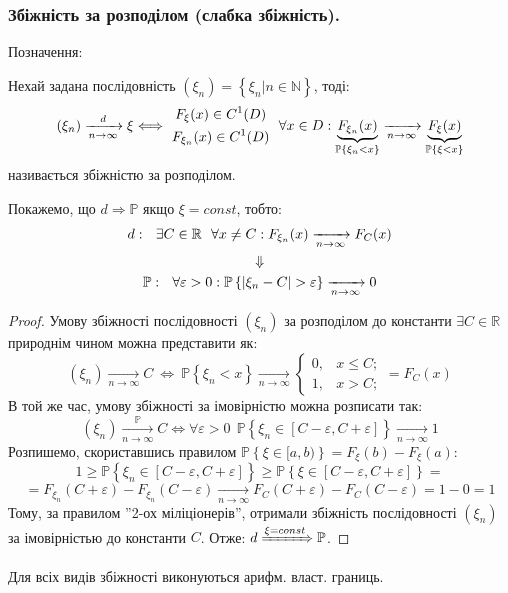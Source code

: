\subsubsection{Збіжність за розподілом (слабка збіжність).}

Позначення: 
\begin{defo} Нехай задана послідовність $(\xi_n) = \left\lbrace \xi_n \Big| n \in \mathbb{N} \right\rbrace$, тоді:
 $$
 (\xi_n) \xrightarrow[n \to \infty]{d} \xi \Longleftrightarrow\  \begin{gathered}
  F_{\xi}(x)\in C^{1}(D)\\
  F_{\xi_n}(x)\in C^{1}(D)
 \end{gathered}\ \  \forall x \in D:  \underbrace{F_{\xi_n}(x)}_{\mathbb{P} \left\lbrace \xi_n < x \right\rbrace} \xrightarrow[n\to\infty]{} \underbrace{F_{\xi}(x)}_{\mathbb{P} \left\lbrace \xi< x \right\rbrace}
 $$
 називається збіжністю за розподілом.\\
\end{defo}
\begin{teo} Покажемо, що $d \Longrightarrow \mathbb{P}$ якщо $ \xi = const$, тобто:
$$
 \begin{gathered}
 d : \ \ \exists C \in \mathbb{R} \  \ \forall x \neq C:  F_{\xi_n}(x) \xrightarrow[n\to\infty]{}F_{C}(x) \\
  \Downarrow\\
\mathbb{P}: \ \ \forall \varepsilon > 0 : \mathbb{P} \left\lbrace \left| \xi_n - C \right| > \varepsilon \right\rbrace \xrightarrow[n\to\infty]{} 0\\
 \end{gathered}
$$
\end{teo}
\begin{proof} Умову збіжності послідовності $(\xi_n)$ за розподілом до константи $\exists C \in \mathbb{R}$ природнім чином можна представити як:
$$
(\xi_n) \xrightarrow[n\to\infty]{} C \ \Longleftrightarrow \ \mathbb{P} \left\lbrace \xi_n < x  \right\rbrace \xrightarrow[n\to\infty]{}
\begin{cases}
 0 ,& x \leq  C; \\
 1 ,&  x > C ;
\end{cases} = F_C(x)
$$
В той же час, умову збіжності за імовірністю можна розписати так:
$$
(\xi_n) \xrightarrow[n \to \infty]{\mathbb{P}} C \Longleftrightarrow
\forall \varepsilon > 0 \ \
\mathbb{P} \left\lbrace   \xi_n \in [C - \varepsilon, C + \varepsilon]   \right\rbrace \xrightarrow[n\to\infty]{}1
$$
Розпишемо, скориставшись правилом $\mathbb{P} \left\lbrace  \xi \in [a,b) \right\rbrace = F_{\xi}(b) - F_{\xi}(a)$:
$$
1 \geq \mathbb{P} \left\lbrace \xi_n \in [C - \varepsilon , C + \varepsilon ] \right\rbrace \geq \mathbb{P} \left\lbrace \xi \in [C- \varepsilon, C + \varepsilon ] \right\rbrace =
$$
$$
= F_{\xi_n} (C+ \varepsilon )- F_{\xi_n} (C - \varepsilon ) \xrightarrow[n\to\infty]{} F_C(C + \varepsilon) - F_C(C - \varepsilon ) = 1 - 0 = 1
$$
Тому, за правилом ''2-ох міліціонерів'', отримали збіжність послідовності $(\xi_n)$ за імовірністью до константи $C$. Отже: $ d \xRightarrow[]{\xi=const} \mathbb{P} $.
\end{proof}
\begin{remark}
    Для всіх видів збіжності виконуються арифм. власт. границь.
\end{remark}
